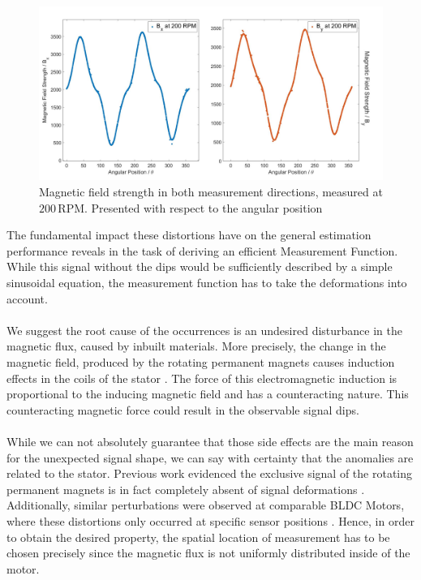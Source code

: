 \documentclass[english]{isasthesis}
\begin{document}
    	\begin{figure}[t]
    		\centering
    			\includegraphics[width=1\textwidth]{figures/dips_200.jpg}   		
    		\caption{Magnetic field strength in both measurement directions, measured at $200\,$RPM. Presented with respect to the angular position}
    		\label{fig:dips}
    		\end{figure}
    	The fundamental impact these distortions have on the general estimation performance reveals in the task of deriving an efficient Measurement Function. While this signal without the dips would be sufficiently described by a simple sinusoidal equation, the measurement function has to take the deformations into account. \\ \\
    	We suggest the root cause of the occurrences is an undesired disturbance in the magnetic flux, caused by inbuilt materials. More precisely, the change in the magnetic field, produced by the rotating permanent magnets causes induction effects in the coils of the stator \cite{krishnan2017permanent}. The force of this electromagnetic induction is proportional to the inducing magnetic field and has a counteracting nature. This counteracting magnetic force could result in the observable signal dips. \\ \\
    		While we can not absolutely guarantee that those side effects are the main reason for the unexpected signal shape, we can say with certainty that the anomalies are related to the stator. Previous work evidenced the exclusive signal of the rotating permanent magnets is in fact completely absent of signal deformations \cite{mayerposition}. Additionally, similar perturbations were observed at comparable BLDC Motors, where these distortions only occurred at specific sensor positions \cite{reigosa2018permanent}. Hence, in order to obtain the desired property, the spatial location of measurement has to be chosen precisely since the magnetic flux is not uniformly distributed inside of the motor.  		
\end{document}
